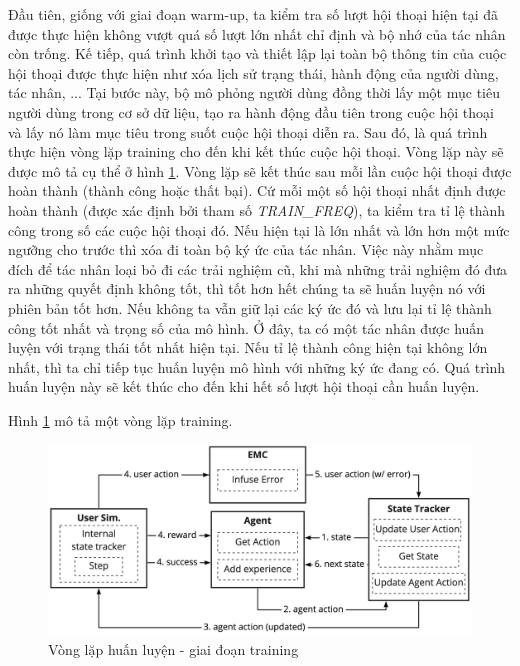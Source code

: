 Đầu tiên, giống với giai đoạn warm-up, ta kiểm tra số lượt hội thoại
hiện tại đã được thực hiện không vượt quá số lượt lớn nhất chỉ định
và bộ nhớ của tác nhân còn trống. Kế tiếp, quá trình khởi tạo và
thiết lập lại toàn bộ thông tin của cuộc hội thoại được thực hiện như
xóa lịch sử trạng thái, hành động của người dùng, tác nhân, ...
Tại bước này, bộ mô phỏng người dùng đồng thời lấy một mục tiêu
người dùng trong cơ sở dữ liệu, tạo ra hành động đầu tiên trong
cuộc hội thoại và lấy nó làm mục tiêu trong suốt cuộc hội thoại
diễn ra. Sau đó, là quá trình thực hiện vòng lặp training cho đến khi
kết thúc cuộc hội thoại. Vòng lặp này sẽ được mô tả cụ thể ở hình
\ref{fig:training}. Vòng lặp sẽ kết thúc sau mỗi lần cuộc hội thoại
được hoàn thành (thành công hoặc thất bại). Cứ mỗi một số hội thoại
nhất định được hoàn thành (được xác định bởi tham số
\textit{TRAIN\_FREQ}), ta kiểm tra tỉ lệ thành công trong số các
cuộc hội thoại đó. Nếu hiện tại là lớn nhất và lớn hơn một mức ngưỡng
cho trước thì xóa đi toàn bộ ký ức của tác nhân. Việc này nhằm
mục đích để tác nhân loại bỏ đi các trải nghiệm cũ, khi mà những
trải nghiệm đó đưa ra những quyết định không tốt, thì tốt hơn hết
chúng ta sẽ huấn luyện nó với phiên bản tốt hơn. Nếu không ta vẫn
giữ lại các ký ức đó và lưu lại tỉ lệ thành công tốt nhất và trọng số
của mô hình. Ở đây, ta có một tác nhân được huấn luyện với trạng thái
tốt nhất hiện tại. Nếu tỉ lệ thành công hiện tại không lớn nhất,
thì ta chỉ tiếp tục huấn luyện mô hình với những ký ức đang có.
Quá trình huấn luyện này sẽ kết thúc cho đến khi hết số lượt hội thoại
cần huấn luyện.

Hình \ref{fig:training} mô tả một vòng lặp training.

\begin{figure}[ht!]
    \centering
    \includegraphics[scale=0.145]{thesis/chatbot/phuongphap/img/training.jpg}
    \caption{Vòng lặp huấn luyện - giai đoạn training}
    \label{fig:training}
\end{figure}

